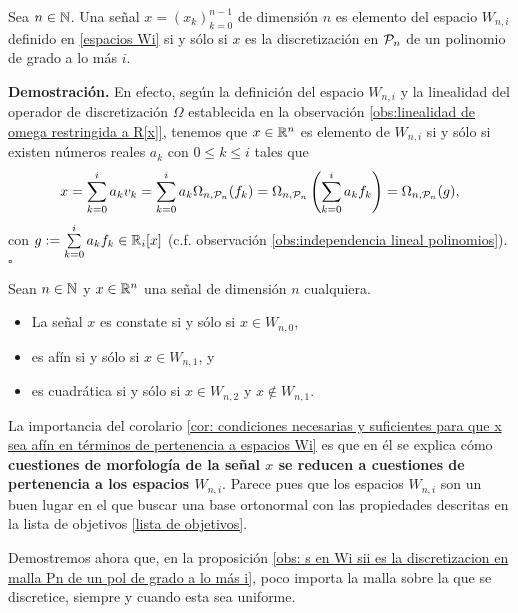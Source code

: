 \begin{prop} \label{obs: s en Wi sii es la discretizacion en malla Pn de un pol de grado a lo más i}
Sea $n \in \mathbb{N}$.
Una señal $x=(x_{k})_{k=0}^{n-1}$ de dimensión $n$
es elemento del espacio $W_{n,i}$ 
definido en \eqref{espacios Wi}
si y sólo si 
$x$ es la discretización en $\mathcal{P}_{n}$
de un polinomio de grado a lo más $i$.
\end{prop}
\noindent
\textbf{Demostración.}
En efecto, según la definición del espacio
$W_{n,i}$ y la linealidad del operador
de discretización 
$\Omega$ establecida en 
la observación
\ref{obs:linealidad de omega restringida a R[x]}, 
tenemos que $x \in \mathbb{R}^{n}$ es elemento de 
$W_{n,i}$ si y sólo si existen números reales
$a_{k}$ con $0 \leq k \leq i$ tales que
\begin{align*}
x=  \sum\limits_{k=0}^{i}a_{k}v_{k} 
=  \sum\limits_{k=0}^{i}a_{k}\Omega_{n, \mathcal{P}_{n}}(f_{k})
=  \Omega_{n, \mathcal{P}_{n}} \left( 
\sum\limits_{k=0}^{i}a_{k}f_{k} \right)
=  \Omega_{n, \mathcal{P}_{n}} (g),
\end{align*}
con $g := \sum\limits_{k=0}^{i}a_{k}f_{k} \in \mathbb{R}_{i}[x]$
(c.f. observación 
\ref{obs:independencia lineal polinomios}).
\null\nobreak\hfill\ensuremath{\square} %


\begin{cor} \label{cor: condiciones necesarias y suficientes para que x sea afín en términos de pertenencia a espacios Wi}
Sean $n \in \mathbb{N}$ y $x \in \mathbb{R}^{n}$ una señal de dimensión
$n$ cualquiera.
\begin{itemize}
\item La señal $x$ es constate si y sólo si $x \in W_{n,0}$,

\item es afín si y sólo si $x \in W_{n,1}$, y 

\item es cuadrática si y sólo si $x \in W_{n,2}$
y $x \not\in W_{n,1}$.
\end{itemize}
\end{cor}
\noindent
La importancia del corolario
\ref{cor: condiciones necesarias y suficientes para que x sea afín en términos de pertenencia a espacios Wi}
es que en él se explica cómo
\textbf{cuestiones de morfología de la señal $x$
se reducen a cuestiones de pertenencia a los espacios $W_{n,i}$}.
Parece pues que los espacios $W_{n,i}$ son un buen lugar
en el que buscar una base ortonormal con las propiedades
descritas en la lista 
de objetivos \ref{lista de objetivos}.

\noindent Demostremos ahora que,
en la proposición
\ref{obs: s en Wi sii es la discretizacion en malla Pn de un pol de grado a lo más i},
poco importa
la malla sobre la que se discretice, siempre y
cuando esta sea uniforme.



